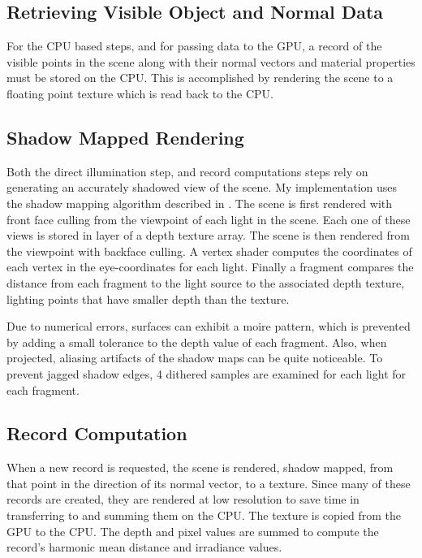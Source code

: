 \documentclass[10pt,twopage]{acmsiggraph}
\begin{document}

\subsection{Retrieving Visible Object and Normal Data}
For the CPU based steps, and for passing data to the GPU, a record of the visible points in the scene along with their normal vectors and material properties must be stored on the CPU.  This is accomplished by rendering the scene to a floating point texture which is read back to the CPU.  

\subsection{Shadow Mapped Rendering}
Both the direct illumination step, and record computations steps rely on generating an accurately shadowed view of the scene.  My implementation uses the shadow mapping algorithm described in \cite{orangebook}.  The scene is first rendered with front face culling from the viewpoint of each light in the scene.  Each one of these views is stored in layer of a depth texture array.  The scene is then rendered from the viewpoint with backface culling.  A vertex shader computes the coordinates of each vertex in the eye-coordinates for each light.  Finally a fragment compares the distance from each fragment to the light source to the associated depth texture, lighting points that have smaller depth than the texture.  

Due to numerical errors, surfaces can exhibit a moire pattern, which is prevented by adding a small tolerance to the depth value of each fragment.  Also, when projected, aliasing artifacts of the shadow maps can be quite noticeable.  To prevent jagged shadow edges, 4 dithered samples are examined for each light for each fragment.

\subsection{Record Computation}
When a new record is requested, the scene is rendered, shadow mapped, from that point in the direction of its normal vector, to a texture.  Since many of these records are created, they are rendered at low resolution to save time in transferring to and summing them on the CPU.    The texture is copied from the GPU to the CPU.  The depth and pixel values are summed to compute the record's harmonic mean distance and irradiance values.  
\end{document}
